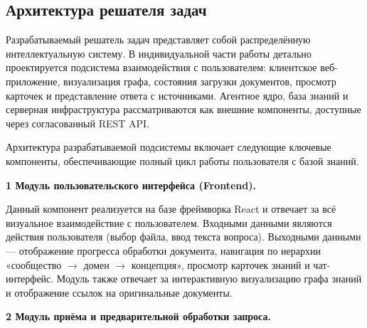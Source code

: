 \subsection{Архитектура решателя задач}
%
%
%

Разрабатываемый решатель задач представляет собой распределённую интеллектуальную систему. В индивидуальной части работы детально проектируется подсистема взаимодействия с пользователем: клиентское веб-приложение, визуализация графа, состояния загрузки документов, просмотр карточек и представление ответа с источниками. Агентное ядро, база знаний и серверная инфраструктура рассматриваются как внешние компоненты, доступные через согласованный REST API.

Архитектура разрабатываемой подсистемы включает следующие ключевые компоненты, обеспечивающие полный цикл работы пользователя с базой знаний.

\vspace{0.5em}
\textbf{1 Модуль пользовательского интерфейса (Frontend).}

Данный компонент реализуется на базе фреймворка React и отвечает за всё визуальное взаимодействие с пользователем. Входными данными являются действия пользователя (выбор файла, ввод текста вопроса). Выходными данными — отображение прогресса обработки документа, навигация по иерархии «сообщество $\rightarrow$ домен $\rightarrow$ концепция», просмотр карточек знаний и чат-интерфейс. Модуль также отвечает за интерактивную визуализацию графа знаний и отображение ссылок на оригинальные документы.

\vspace{0.5em}
\textbf{2 Модуль приёма и предварительной обработки запроса.}

